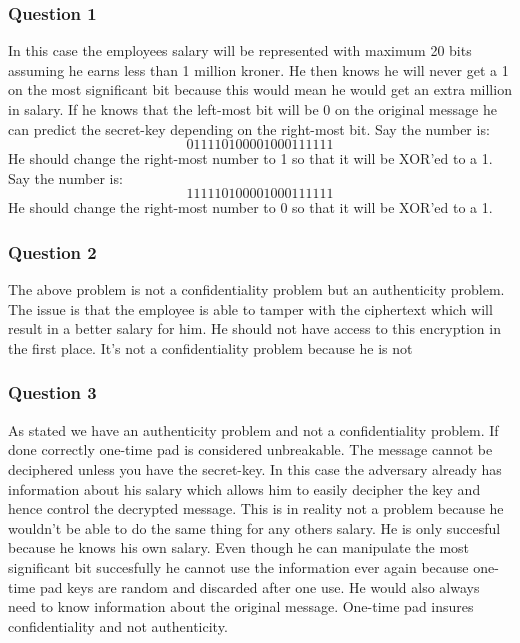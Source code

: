 \documentclass[
  paper=a4,
  ,captions=tableheading
]{scrartcl}
\begin{document}
\hypertarget{question-1}{%
\subsubsection{Question 1}\label{question-1}}

In this case the employees salary will be represented with maximum 20
bits assuming he earns less than 1 million kroner. He then knows he will
never get a 1 on the most significant bit because this would mean he
would get an extra million in salary. If he knows that the left-most bit
will be 0 on the original message he can predict the secret-key
depending on the right-most bit. Say the number is: \[
011110100001000111111
\] He should change the right-most number to 1 so that it will be XOR'ed
to a 1. Say the number is: \[
111110100001000111111
\] He should change the right-most number to 0 so that it will be XOR'ed
to a 1.

\hypertarget{question-2}{%
\subsubsection{Question 2}\label{question-2}}

The above problem is not a confidentiality problem but an authenticity
problem. The issue is that the employee is able to tamper with the
ciphertext which will result in a better salary for him. He should not
have access to this encryption in the first place. It's not a
confidentiality problem because he is not

\hypertarget{question-3}{%
\subsubsection{Question 3}\label{question-3}}

As stated we have an authenticity problem and not a confidentiality
problem. If done correctly one-time pad is considered unbreakable. The
message cannot be deciphered unless you have the secret-key. In this
case the adversary already has information about his salary which allows
him to easily decipher the key and hence control the decrypted message.
This is in reality not a problem because he wouldn't be able to do the
same thing for any others salary. He is only succesful because he knows
his own salary. Even though he can manipulate the most significant bit
succesfully he cannot use the information ever again because one-time
pad keys are random and discarded after one use. He would also always
need to know information about the original message. One-time pad
insures confidentiality and not authenticity.
\end{document}
